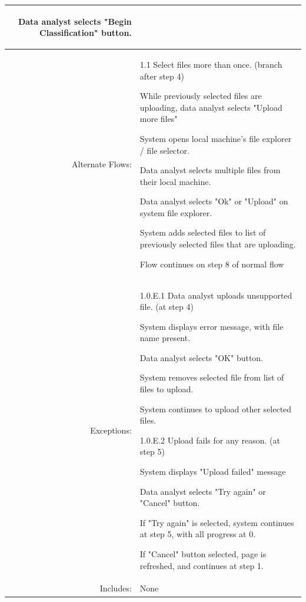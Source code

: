 \documentclass[12pt,oneside,letterpaper]{article}
\newenvironment{packed_enumerate}{ %
\vspace{-7mm}
\begin{enumerate}
  \setlength{\itemsep}{0pt}
  \setlength{\parskip}{0pt}
  \setlength{\parsep}{0pt}
}{\end{enumerate}
\vspace{-8mm}}
\begin{document}
\begin{longtable}{|r|p{3.8in}|}
\begin{packed_enumerate}
\item Data analyst selects "Begin Classification" button.
\end{packed_enumerate}\\
\hline
Alternate Flows:&1.1 Select files more than once. (branch after step 4)\newline
\begin{packed_enumerate}
\item While previously selected files are uploading, data analyst selects "Upload more files"
\item System opens local machine's file explorer / file selector.
\item Data analyst selects multiple files from their local machine.
\item Data analyst selects "Ok" or "Upload" on system file explorer.
\item System adds selected files to list of previously selected files that are uploading.
\item Flow continues on step 8 of normal flow
\end{packed_enumerate}\\
\hline
Exceptions:&1.0.E.1 Data analyst uploads unsupported file. (at step 4)\newline
\begin{packed_enumerate}
\item System displays error message, with file name present.
\item Data analyst selects "OK" button.
\item System removes selected file from list of files to upload.
\item System continues to upload other selected files.\newline
\end{packed_enumerate}
1.0.E.2 Upload fails for any reason. (at step 5)\newline
\begin{packed_enumerate}
\item System displays "Upload failed" message
\item Data analyst selects "Try again" or "Cancel" button.
\item If "Try again" is selected, system continues at step 5, with all progress at 0.
\item If "Cancel" button selected, page is refreshed, and continues at step 1.
\end{packed_enumerate}\\
\hline
Includes:&None\\

\end{longtable}
\end{document}
